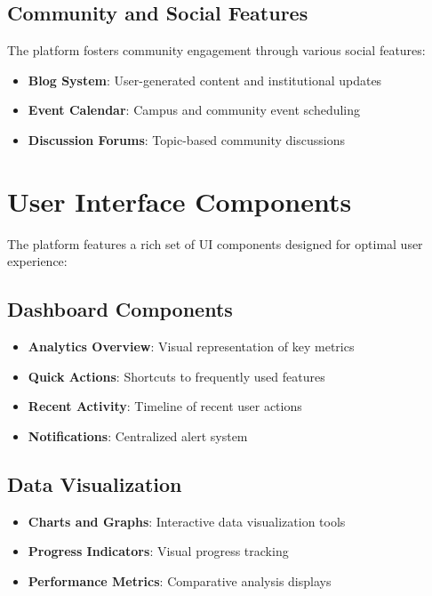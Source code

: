 \subsection{Community and Social Features}

The platform fosters community engagement through various social features:

\begin{itemize}
    \item \textbf{Blog System}: User-generated content and institutional updates
    \item \textbf{Event Calendar}: Campus and community event scheduling
    \item \textbf{Discussion Forums}: Topic-based community discussions
\end{itemize}

\section{User Interface Components}

The platform features a rich set of UI components designed for optimal user experience:

\subsection{Dashboard Components}

\begin{itemize}
    \item \textbf{Analytics Overview}: Visual representation of key metrics
    \item \textbf{Quick Actions}: Shortcuts to frequently used features
    \item \textbf{Recent Activity}: Timeline of recent user actions
    \item \textbf{Notifications}: Centralized alert system
\end{itemize}

\subsection{Data Visualization}

\begin{itemize}
    \item \textbf{Charts and Graphs}: Interactive data visualization tools
    \item \textbf{Progress Indicators}: Visual progress tracking
    \item \textbf{Performance Metrics}: Comparative analysis displays
\end{itemize}

